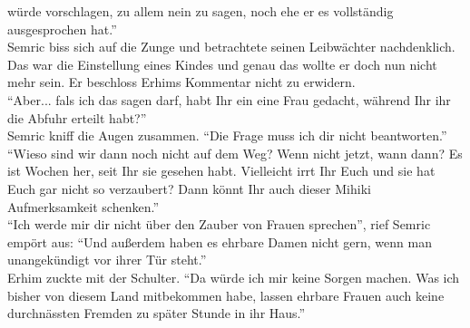 würde vorschlagen, zu allem nein zu sagen, noch ehe er es vollständig ausgesprochen hat.''\\
Semric biss sich auf die Zunge und betrachtete seinen Leibwächter nachdenklich. Das war die 
Einstellung eines Kindes und genau das wollte er doch nun nicht mehr sein. Er beschloss Erhims 
Kommentar nicht zu erwidern.\\
``Aber... fals ich das sagen darf, habt Ihr ein eine Frau gedacht, während Ihr ihr die Abfuhr 
erteilt habt?''\\
Semric kniff die Augen zusammen. ``Die Frage muss ich dir nicht beantworten.''\\
``Wieso sind wir dann noch nicht auf dem Weg? Wenn nicht jetzt, wann dann? Es ist Wochen her, seit 
Ihr sie gesehen habt. Vielleicht irrt Ihr Euch und sie hat Euch gar nicht so verzaubert? Dann könnt 
Ihr auch dieser Mihiki Aufmerksamkeit schenken.''\\
``Ich werde mir dir nicht über den Zauber von Frauen sprechen'', rief Semric empört aus: ``Und 
außerdem haben es ehrbare Damen nicht gern, wenn man unangekündigt vor ihrer Tür steht.''\\
Erhim zuckte mit der Schulter. ``Da würde ich mir keine Sorgen machen. Was ich bisher  von diesem 
Land mitbekommen habe, lassen ehrbare Frauen auch keine durchnässten Fremden zu später Stunde in 
ihr Haus.''\\
